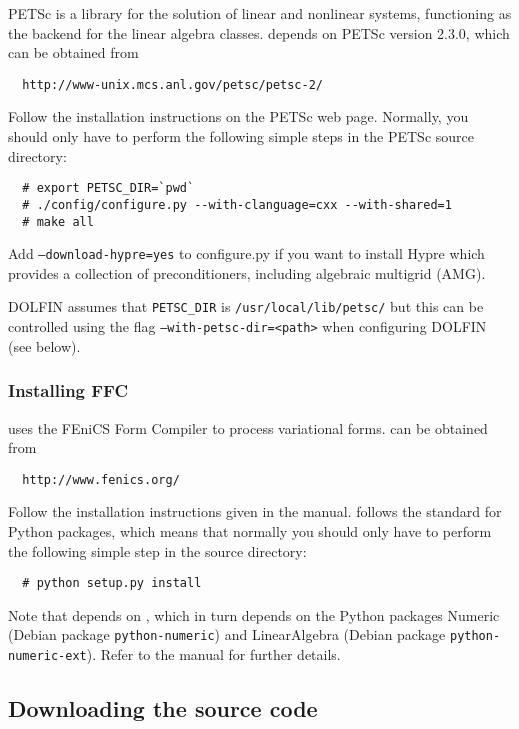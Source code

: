 PETSc is a library for the solution of linear and nonlinear systems, functioning as the backend
for the \dolfin{} linear algebra classes. \dolfin{} depends on PETSc version 2.3.0, which can be
obtained from
\begin{verbatim}
  http://www-unix.mcs.anl.gov/petsc/petsc-2/
\end{verbatim}

Follow the installation instructions on the PETSc web page. Normally,
you should only have to perform the following simple steps in the PETSc
source directory:
\begin{verbatim}
  # export PETSC_DIR=`pwd`
  # ./config/configure.py --with-clanguage=cxx --with-shared=1
  # make all
\end{verbatim}

Add \texttt{--download-hypre=yes} to configure.py if you want to
install Hypre which provides a collection of preconditioners,
including algebraic multigrid (AMG).

DOLFIN assumes that \texttt{PETSC\_DIR} is
\texttt{/usr/local/lib/petsc/} but this can be controlled using the
flag \texttt{--with-petsc-dir=<path>} when configuring DOLFIN (see
below).

\subsubsection{Installing FFC}

\dolfin{} uses the FEniCS Form Compiler \ffc{} to process variational
forms. \ffc{} can be obtained from
\begin{verbatim}
  http://www.fenics.org/
\end{verbatim}

Follow the installation instructions given in the \ffc{}
manual. \ffc{} follows the standard for Python packages, which means
that normally you should only have to perform the following simple step
in the \ffc{} source directory:
\begin{verbatim}
  # python setup.py install
\end{verbatim}

Note that \ffc{} depends on \fiat{} , which in turn depends on
the Python packages Numeric (Debian package \texttt{python-numeric}) and
LinearAlgebra (Debian package \texttt{python-numeric-ext}). Refer to
the \ffc{} manual for further details.

\subsection{Downloading the source code}

